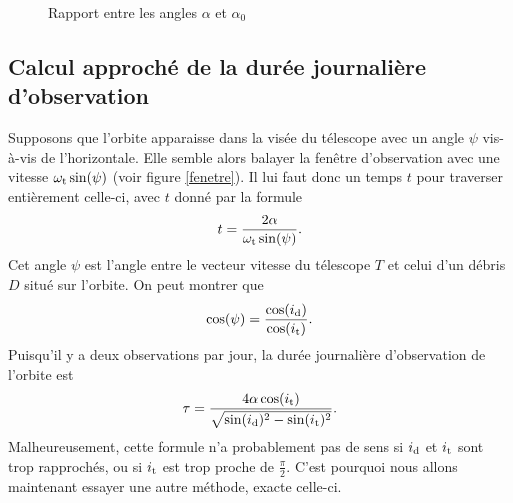 \begin{figure}
\begin{center}
\scriptsize
\def\figurewidth{0.6\linewidth}

\caption{Rapport entre les angles $\alpha$ et $\alpha_0$} \label{alpha}
\end{center}
\end{figure}


\subsection{Calcul approché de la durée journalière d'observation}

Supposons que l'orbite apparaisse dans la visée du télescope avec un angle $\psi$ vis-à-vis de l'horizontale. Elle semble alors balayer la fenêtre d'observation avec une vitesse $\omega_\text{t} \sin(\psi)$ (voir figure \ref{fenetre}). Il lui faut donc un temps $t$ pour traverser entièrement celle-ci, avec $t$ donné par la formule
\[ t = \frac{2\alpha}{\omega_\text{t} \sin(\psi)}.\]
Cet angle $\psi$ est l'angle entre le vecteur vitesse du télescope $T$ et celui d'un débris $D$ situé sur l'orbite. 
On peut montrer que
\[ 
\cos(\psi) = \frac{\cos(i_\text{d})}{\cos(i_\text{t})}.
\]
Puisqu'il y a deux observations par jour, la durée journalière d'observation de l'orbite est
\[ \tau = \frac{4\alpha\cos(i_\text{t})}{\sqrt{\sin(i_\text{d})^2 - \sin(i_\text{t})^2}}.\]
Malheureusement, cette formule n'a probablement pas de sens si $i_\text{d}$ et $i_\text{t}$ sont trop rapprochés, ou si $i_\text{t}$ est trop proche de $\frac{\pi}{2}$. C'est pourquoi nous allons maintenant essayer une autre méthode, exacte celle-ci.

